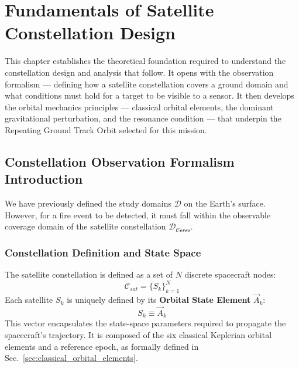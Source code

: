 \chapter{Fundamentals of Satellite Constellation
Design}\label{chapter-7-fundamentals-of-satellite-constellation-design}

This chapter establishes the theoretical foundation required to understand the constellation design and analysis that follow. It opens with the observation formalism --- defining how a satellite constellation covers a ground domain and what conditions must hold for a target to be visible to a sensor. It then develops the orbital mechanics principles --- classical orbital elements, the dominant gravitational perturbation, and the resonance condition --- that underpin the Repeating Ground Track Orbit selected for this mission.

\section{Constellation Observation Formalism Introduction}
\label{sec:Constellation_observation_form}
We have previously defined the study domains $\mathcal{D}$ on the Earth's surface. However, for a fire event to be detected, it must fall within the observable coverage domain of the satellite constellation $\mathcal{D_{Cover}}$.  

\subsection{Constellation Definition and State Space}
The satellite constellation is defined as a set of $N$ discrete spacecraft nodes:
\begin{equation}
    \mathcal{C}_{sat} = \{ S_k \}_{k=1}^{N}
\end{equation}
Each satellite $S_k$ is uniquely defined by its \textbf{Orbital State Element} $\vec{A}_k$:
\begin{equation}
    S_{k} \equiv \vec{A}_k
\end{equation}
This vector encapsulates the state-space parameters required to propagate the spacecraft's trajectory. It is composed of the six classical Keplerian orbital elements and a reference epoch, as formally defined in Sec.~\ref{sec:classical_orbital_elements}.



